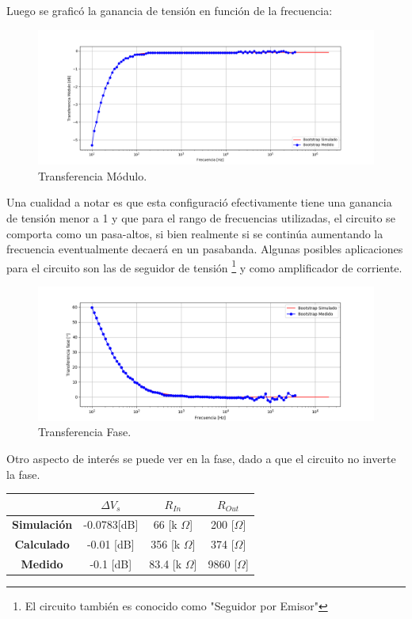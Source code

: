\documentclass[a4paper]{article}
\begin{document}
Luego se graficó la ganancia de tensión en función de la frecuencia:
\begin{figure} [H]
	\centering
	\includegraphics[width=\textwidth]{imagenes/avs.png}
	\caption{Transferencia Módulo.}
	\label{fig:transmod}
\end{figure}
Una cualidad  a notar es que esta configuració efectivamente tiene una ganancia de tensión menor a 1  y que para el rango de frecuencias utilizadas, el circuito se comporta como un pasa-altos, si bien realmente si se continúa aumentando la frecuencia eventualmente decaerá en un pasabanda. Algunas posibles aplicaciones para el circuito son las de seguidor de tensión \footnote{El circuito también es conocido como "Seguidor por Emisor"} y como amplificador de corriente.
\begin{figure} [H]
	\centering
	\includegraphics[width=\textwidth]{imagenes/avsp.png}
	\caption{Transferencia Fase.}
	\label{fig:transph}
\end{figure}
Otro aspecto de interés se puede ver en la fase, dado a que el circuito no inverte la fase.

\begin{table}[H]
\centering
\begin{tabular}{|c|c|c|c|}
\hline
\cellcolor[HTML]{000000} & \textbf{$\Delta V_s$} & \textbf{$R_{In}$} & \textbf{$R_{Out}$} \\ \hline
\textbf{Simulación}      & -0.0783[dB]           & 66 [k $\Omega$]   & 200 [$\Omega$]     \\ \hline
\textbf{Calculado}       & -0.01 [dB]            & 356 [k $\Omega$]  & 374 [$\Omega$]     \\ \hline
\textbf{Medido}          & -0.1 [dB]             & 83.4 [k $\Omega$] & 9860 [$\Omega$]    \\ \hline
\end{tabular}
\end{table}
\end{document}
